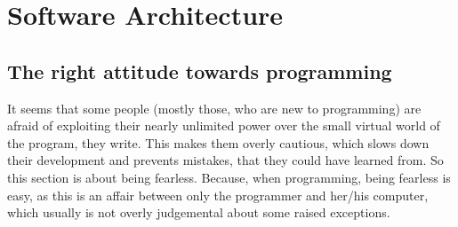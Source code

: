 
\chapter{Software Architecture}
	\section{The right attitude towards programming}
		It seems that some people (mostly those, who are new to programming) are afraid of exploiting their nearly unlimited power over the small virtual world of the program, they write.
		This makes them overly cautious, which slows down their development and prevents mistakes, that they could have learned from.
		So this section is about being fearless.
		Because, when programming, being fearless is easy, as this is an affair between only the programmer and her/his computer, which usually is not overly judgemental about some raised exceptions.


